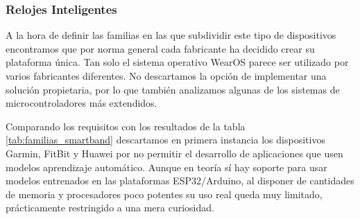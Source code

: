 \subsubsection{Relojes Inteligentes}

A la hora de definir las familias en las que subdividir este tipo de dispositivos encontramos que por norma general cada fabricante ha decidido crear su plataforma única. Tan solo el sistema operativo WearOS parece ser utilizado por varios fabricantes diferentes. No descartamos la opción de implementar una solución propietaria, por lo que también analizamos algunas de los sistemas de microcontroladores más extendidos.


Comparando los requisitos con los resultados de la tabla \ref{tab:familias_smartband} descartamos en primera instancia los dispositivos Garmin, FitBit y Huawei por no permitir el desarrollo de aplicaciones que usen modelos aprendizaje automático. Aunque en teoría sí hay soporte para usar modelos entrenados en las plataformas ESP32/Arduino, al disponer de cantidades de memoria y procesadores poco potentes su uso real queda muy limitado, prácticamente restringido a una mera curiosidad.

